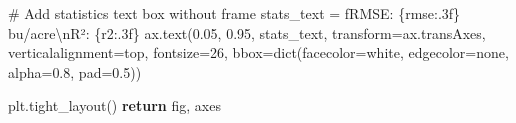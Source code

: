 \documentclass[
  letterpaper,
  DIV=11,
  numbers=noendperiod]{scrreprt}
\newenvironment{Shaded}{\begin{snugshade}}{\end{snugshade}}
\newcommand{\BuiltInTok}[1]{\textcolor[rgb]{0.00,0.23,0.31}{#1}}
\newcommand{\CharTok}[1]{\textcolor[rgb]{0.13,0.47,0.30}{#1}}
\newcommand{\CommentTok}[1]{\textcolor[rgb]{0.37,0.37,0.37}{#1}}
\newcommand{\ControlFlowTok}[1]{\textcolor[rgb]{0.00,0.23,0.31}{\textbf{#1}}}
\newcommand{\DecValTok}[1]{\textcolor[rgb]{0.68,0.00,0.00}{#1}}
\newcommand{\FloatTok}[1]{\textcolor[rgb]{0.68,0.00,0.00}{#1}}
\newcommand{\NormalTok}[1]{\textcolor[rgb]{0.00,0.23,0.31}{#1}}
\newcommand{\OperatorTok}[1]{\textcolor[rgb]{0.37,0.37,0.37}{#1}}
\newcommand{\SpecialCharTok}[1]{\textcolor[rgb]{0.37,0.37,0.37}{#1}}
\newcommand{\SpecialStringTok}[1]{\textcolor[rgb]{0.13,0.47,0.30}{#1}}
\newcommand{\StringTok}[1]{\textcolor[rgb]{0.13,0.47,0.30}{#1}}
\begin{document}
\begin{Shaded}
\begin{Highlighting}[]
        \CommentTok{\# Add statistics text box without frame}
\NormalTok{        stats\_text }\OperatorTok{=} \SpecialStringTok{f\textquotesingle{}RMSE: }\SpecialCharTok{\{}\NormalTok{rmse}\SpecialCharTok{:.3f\}}\SpecialStringTok{ bu/acre}\CharTok{\textbackslash{}n}\SpecialStringTok{R²: }\SpecialCharTok{\{}\NormalTok{r2}\SpecialCharTok{:.3f\}}\SpecialStringTok{\textquotesingle{}}
\NormalTok{        ax.text(}\FloatTok{0.05}\NormalTok{, }\FloatTok{0.95}\NormalTok{, stats\_text,}
\NormalTok{                transform}\OperatorTok{=}\NormalTok{ax.transAxes,}
\NormalTok{                verticalalignment}\OperatorTok{=}\StringTok{\textquotesingle{}top\textquotesingle{}}\NormalTok{,}
\NormalTok{                fontsize}\OperatorTok{=}\DecValTok{26}\NormalTok{,}
\NormalTok{                bbox}\OperatorTok{=}\BuiltInTok{dict}\NormalTok{(facecolor}\OperatorTok{=}\StringTok{\textquotesingle{}white\textquotesingle{}}\NormalTok{,}
\NormalTok{                         edgecolor}\OperatorTok{=}\StringTok{\textquotesingle{}none\textquotesingle{}}\NormalTok{,}
\NormalTok{                         alpha}\OperatorTok{=}\FloatTok{0.8}\NormalTok{,}
\NormalTok{                         pad}\OperatorTok{=}\FloatTok{0.5}\NormalTok{))}

\NormalTok{    plt.tight\_layout()}
    \ControlFlowTok{return}\NormalTok{ fig, axes}
\end{Highlighting}
\end{Shaded}
\end{document}
